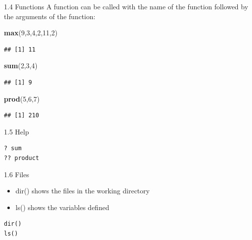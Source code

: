\documentclass[
  ignorenonframetext,
]{beamer}
\newenvironment{Shaded}{\begin{snugshade}}{\end{snugshade}}
\newcommand{\DecValTok}[1]{\textcolor[rgb]{0.00,0.00,0.81}{#1}}
\newcommand{\FunctionTok}[1]{\textcolor[rgb]{0.13,0.29,0.53}{\textbf{#1}}}
\newcommand{\NormalTok}[1]{#1}
\providecommand{\tightlist}{%
  \setlength{\itemsep}{0pt}\setlength{\parskip}{0pt}}
\begin{document}
\begin{frame}[fragile]{1.4 Functions}
\protect\hypertarget{functions}{}
A function can be called with the name of the function followed by the
arguments of the function:

\begin{Shaded}
\begin{Highlighting}[]
\FunctionTok{max}\NormalTok{(}\DecValTok{9}\NormalTok{,}\DecValTok{3}\NormalTok{,}\DecValTok{4}\NormalTok{,}\DecValTok{2}\NormalTok{,}\DecValTok{11}\NormalTok{,}\DecValTok{2}\NormalTok{)}
\end{Highlighting}
\end{Shaded}

\begin{verbatim}
## [1] 11
\end{verbatim}

\begin{Shaded}
\begin{Highlighting}[]
\FunctionTok{sum}\NormalTok{(}\DecValTok{2}\NormalTok{,}\DecValTok{3}\NormalTok{,}\DecValTok{4}\NormalTok{)}
\end{Highlighting}
\end{Shaded}

\begin{verbatim}
## [1] 9
\end{verbatim}

\begin{Shaded}
\begin{Highlighting}[]
\FunctionTok{prod}\NormalTok{(}\DecValTok{5}\NormalTok{,}\DecValTok{6}\NormalTok{,}\DecValTok{7}\NormalTok{)}
\end{Highlighting}
\end{Shaded}

\begin{verbatim}
## [1] 210
\end{verbatim}
\end{frame}

\begin{frame}[fragile]{1.5 Help}
\protect\hypertarget{help}{}
\begin{verbatim}
? sum
?? product
\end{verbatim}
\end{frame}

\begin{frame}[fragile]{1.6 Files}
\protect\hypertarget{files}{}
\begin{itemize}
\tightlist
\item
  dir() shows the files in the working directory
\item
  ls() shows the variables defined
\end{itemize}

\begin{verbatim}
dir()
ls()
\end{verbatim}
\end{frame}
\end{document}
